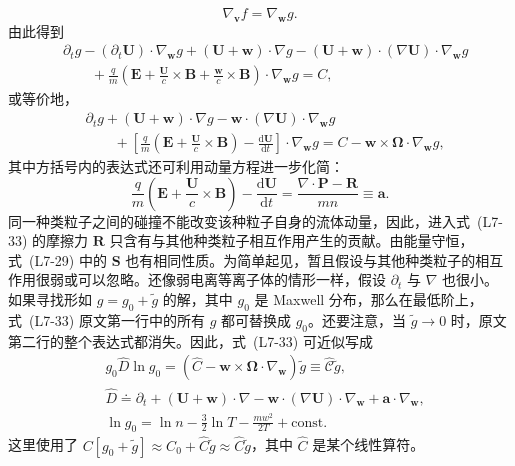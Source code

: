 \begin{equation}
\nabla_{\boldsymbol v}f=\nabla_{\boldsymbol w}g.
\tag{L7-31c}\label{eq:L7:31c}
\end{equation}
由此得到
\begin{equation}
\begin{aligned}
&\partial_tg-(\partial_t\boldsymbol U)\cdot\nabla_{\boldsymbol w}g
 +(\boldsymbol U+\boldsymbol w)\cdot\nabla g
 -(\boldsymbol U+\boldsymbol w)\cdot(\nabla\boldsymbol U)\cdot\nabla_{\boldsymbol w}g\\
&\qquad+\frac qm\left(\boldsymbol E+\frac{\boldsymbol U}c\times\boldsymbol B
 +\frac{\boldsymbol w}c\times\boldsymbol B\right)\cdot\nabla_{\boldsymbol w}g=C,
\end{aligned}\tag{L7-32}\label{eq:L7:32}
\end{equation}
或等价地，
\begin{equation}
\begin{aligned}
&\partial_tg+(\boldsymbol U+\boldsymbol w)\cdot\nabla g
 -\boldsymbol w\cdot(\nabla\boldsymbol U)\cdot\nabla_{\boldsymbol w}g\\
&\qquad+\left[\frac qm\left(\boldsymbol E+\frac{\boldsymbol U}c\times\boldsymbol B\right)
 -\frac{\mathrm d\boldsymbol U}{\mathrm dt}\right]\cdot\nabla_{\boldsymbol w}g
 =C-\boldsymbol w\times\boldsymbol\Omega\cdot\nabla_{\boldsymbol w}g,
\end{aligned}\tag{L7-33}\label{eq:L7:33}
\end{equation}
其中方括号内的表达式还可利用动量方程进一步化简：
\begin{equation}
\frac qm\left(\boldsymbol E+\frac{\boldsymbol U}c\times\boldsymbol B\right)
-\frac{\mathrm d\boldsymbol U}{\mathrm dt}
=\frac{\nabla\cdot\boldsymbol P-\boldsymbol R}{mn}\equiv\boldsymbol a.
\tag{L7-34}\label{eq:L7:34}
\end{equation}
同一种类粒子之间的碰撞不能改变该种粒子自身的流体动量，因此，进入式~(L7-33) 的摩擦力 $\boldsymbol R$ 只含有与其他种类粒子相互作用产生的贡献。由能量守恒，式~(L7-29) 中的 $\boldsymbol S$ 也有相同性质。为简单起见，暂且假设与其他种类粒子的相互作用很弱或可以忽略。还像弱电离等离子体的情形一样，假设 $\partial_t$ 与 $\nabla$ 也很小。如果寻找形如 $g=g_0+\widetilde g$ 的解，其中 $g_0$ 是 Maxwell 分布，那么在最低阶上，式~(L7-33) 原文第一行中的所有 $g$ 都可替换成 $g_0$。还要注意，当 $\widetilde g\to0$ 时，原文第二行的整个表达式都消失。因此，式~(L7-33) 可近似写成
\begin{align}
&g_0\widehat D\ln g_0
 =\left(\widehat C-\boldsymbol w\times\boldsymbol\Omega\cdot\nabla_{\boldsymbol w}\right)\widetilde g
 \equiv\widehat{\mathcal C}\widetilde g,
 \tag{L7-35a}\label{eq:L7:35a}\\
&\widehat D\doteq\partial_t+(\boldsymbol U+\boldsymbol w)\cdot\nabla
 -\boldsymbol w\cdot(\nabla\boldsymbol U)\cdot\nabla_{\boldsymbol w}
 +\boldsymbol a\cdot\nabla_{\boldsymbol w},
 \tag{L7-35b}\label{eq:L7:35b}\\
&\ln g_0=\ln n-\frac32\ln T-\frac{mw^2}{2T}+\mathrm{const}.
 \tag{L7-35c}\label{eq:L7:35c}
\end{align}
这里使用了 $C[g_0+\widetilde g]\approx C_0+\widehat C\widetilde g\approx\widehat C\widetilde g$，其中 $\widehat C$ 是某个线性算符。

